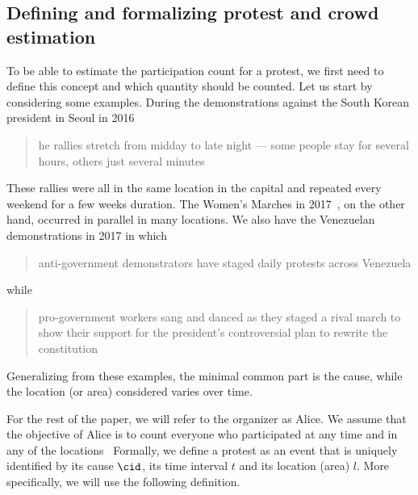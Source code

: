 \subsection{Defining and formalizing protest and crowd estimation}%
\label{protest-model}


To be able to estimate the participation count for a protest, we first need to define this concept and which quantity should be counted.
Let us start by considering some examples.
During the demonstrations against the South Korean president in Seoul in 2016
\blockcquote{2016DemonstrationsInSeoul}{%
  he rallies stretch from midday to late night --- some people stay for several hours, others just several minutes%
}.
These rallies were all in the same location in the capital and repeated every weekend for a few weeks duration.
The Women's Marches in 2017~\cite{2017WomensMarchesInUS}, on the other hand, occurred in parallel in many locations.
We also have the Venezuelan demonstrations in 2017 in which \blockcquote{2017VenezuelaProtestFrequency}{%
  anti-government demonstrators have staged daily protests across Venezuela%
} while
\blockcquote{AlJazeeraOnVenezuela2017}{%
  pro-government workers sang and danced as they staged a rival march to show their support for the president's controversial plan to rewrite the constitution%
}.
Generalizing from these examples, the minimal common part is the cause,\label{CauseIsTheCommonDenominator} while the location (or area) considered varies over time.

For the rest of the paper, we will refer to the organizer as Alice.
We assume that the objective of Alice is to count everyone who participated at any time and in any of the locations~\cite{2016DemonstrationsInSeoul} %
Formally, we define a protest as an event that is uniquely identified by its cause \(\cid\), its time interval \(t\) and its location (area) \(l\).
More specifically, we will use the following definition.

